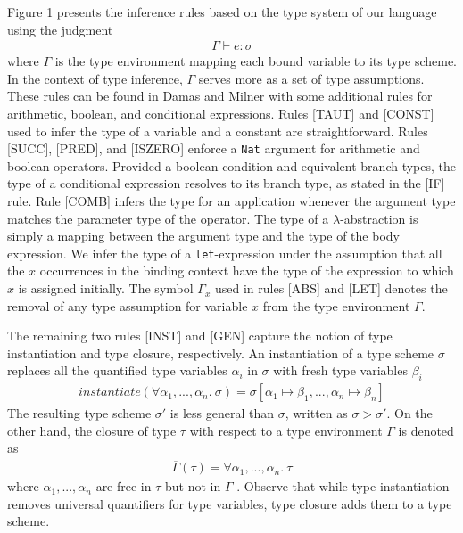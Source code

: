 Figure 1 presents the inference rules based on the type system of our language 
using the judgment
\begin{align*}
    \Gamma \vdash e : \sigma
\end{align*}
where $\Gamma$ is the type environment mapping each bound variable to its type scheme. 
In the context of type inference, $\Gamma$ serves more as a set of type assumptions. 
These rules can be found in Damas and Milner \cite{damas} with some additional rules 
for arithmetic, boolean, and conditional expressions. Rules {\scriptsize{[TAUT]}}  
and {\scriptsize{[CONST]}} used to infer the type of a variable and a constant   
are straightforward. Rules {\scriptsize{[SUCC]}}, 
{\scriptsize{[PRED]}}, and {\scriptsize{[ISZERO]}} enforce a \texttt{Nat} argument 
for arithmetic and boolean operators. Provided a boolean condition and equivalent branch types, 
the type of a conditional expression resolves to its branch type, as 
stated in the {\scriptsize{[IF]}} rule. Rule {\scriptsize{[COMB]}} infers the type 
for an application whenever the argument type matches the parameter type of the operator. 
The type of a $\lambda$-abstraction is simply a mapping between the argument type and 
the type of the body expression. We infer the type of a \texttt{let}-expression under the 
assumption that all the $x$ occurrences in the binding context have the type of 
the expression to which $x$ is assigned initially. The symbol $\Gamma _x$ used in 
rules {\scriptsize{[ABS]}} and {\scriptsize{[LET]}} denotes the removal of 
any type assumption for variable $x$ from the type environment $\Gamma$.


The remaining two rules {\scriptsize{[INST]}} and {\scriptsize{[GEN]}} capture 
the notion of type instantiation and type closure, respectively. An instantiation 
of a type scheme $\sigma$ replaces all the quantified type variables $\alpha _i$ in $\sigma$ 
with fresh type variables $\beta _i$ \cite{heeran}
\begin{align*}  
    instantiate(\forall \alpha _1,...,\alpha _n. \: \sigma) = \sigma[\alpha _1 \mapsto \beta _1,...,
    \alpha _n \mapsto \beta _n]
\end{align*}
The resulting type scheme $\sigma'$ is less general than $\sigma$, written as $\sigma > \sigma'$. 
On the other hand, the closure of type $\tau$ with respect to a type environment 
$\Gamma$ is denoted as 
\begin{align*}
    \overline{\Gamma}(\tau) = \forall \alpha _1,...,\alpha _n. \: \tau
\end{align*}
where $\alpha _1,...,\alpha _n$ are free in $\tau$ but not in $\Gamma$ \cite{damas}. Observe that 
while type instantiation removes universal quantifiers for type variables, type closure 
adds them to a type scheme.